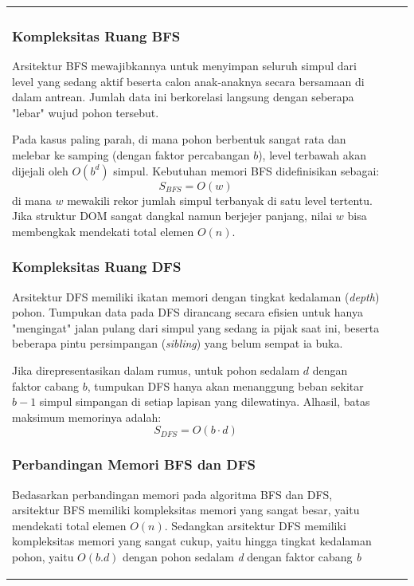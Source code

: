 \documentclass[12pt]{article}
\begin{document}
\begin{table}[H]
\begin{tabular}{|l|c|c|}
\begin{document}
\subsubsection{Kompleksitas Ruang BFS}

Arsitektur BFS mewajibkannya untuk menyimpan seluruh simpul dari level yang sedang aktif beserta calon anak-anaknya secara bersamaan di dalam antrean. Jumlah data ini berkorelasi langsung dengan seberapa "lebar" wujud pohon tersebut.

Pada kasus paling parah, di mana pohon berbentuk sangat rata dan melebar ke samping (dengan faktor percabangan $b$), level terbawah akan dijejali oleh $O(b^d)$ simpul. Kebutuhan memori BFS didefinisikan sebagai:
\[
S_{BFS} = O(w)
\]
di mana $w$ mewakili rekor jumlah simpul terbanyak di satu level tertentu. Jika struktur DOM sangat dangkal namun berjejer panjang, nilai $w$ bisa membengkak mendekati total elemen $O(n)$.

\subsubsection{Kompleksitas Ruang DFS}

Arsitektur DFS memiliki ikatan memori dengan tingkat kedalaman (\textit{depth}) pohon. Tumpukan data pada DFS dirancang secara efisien untuk hanya "mengingat" jalan pulang dari simpul yang sedang ia pijak saat ini, beserta beberapa pintu persimpangan (\textit{sibling}) yang belum sempat ia buka.

Jika direpresentasikan dalam rumus, untuk pohon sedalam $d$ dengan faktor cabang $b$, tumpukan DFS hanya akan menanggung beban sekitar $b - 1$ simpul simpangan di setiap lapisan yang dilewatinya. Alhasil, batas maksimum memorinya adalah:
\[
S_{DFS} = O(b \cdot d)
\]

\subsubsection{Perbandingan Memori BFS dan DFS}

Bedasarkan perbandingan memori pada algoritma BFS dan DFS, arsitektur BFS memiliki kompleksitas memori yang sangat besar, yaitu mendekati  total elemen $O(n)$. Sedangkan arsitektur DFS memiliki kompleksitas memori yang sangat cukup, yaitu hingga tingkat kedalaman pohon, yaitu $O(b.d)$ dengan pohon sedalam \textit{d} dengan faktor cabang \textit{b} 


\end{document}
\end{tabular}
\end{table}
\end{document}
